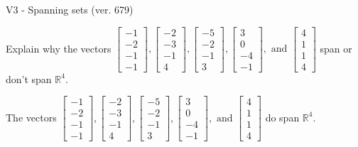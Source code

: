 \begin{exercise}
  \begin{exerciseTitle}V3 - Spanning sets (ver. 679)\end{exerciseTitle}
  \begin{exerciseStatement}
    Explain why the vectors \(\left[\begin{array}{r}
-1 \\
-2 \\
-1 \\
-1
\end{array}\right] , \left[\begin{array}{r}
-2 \\
-3 \\
-1 \\
4
\end{array}\right] , \left[\begin{array}{r}
-5 \\
-2 \\
-1 \\
3
\end{array}\right] , \left[\begin{array}{r}
3 \\
0 \\
-4 \\
-1
\end{array}\right] , \text{ and } \left[\begin{array}{r}
4 \\
1 \\
1 \\
4
\end{array}\right]\) span or don't span \(\mathbb{R}^4\). 
	


  \end{exerciseStatement}
  \begin{exerciseAnswer}
   The vectors \(\left[\begin{array}{r}
-1 \\
-2 \\
-1 \\
-1
\end{array}\right] , \left[\begin{array}{r}
-2 \\
-3 \\
-1 \\
4
\end{array}\right] , \left[\begin{array}{r}
-5 \\
-2 \\
-1 \\
3
\end{array}\right] , \left[\begin{array}{r}
3 \\
0 \\
-4 \\
-1
\end{array}\right] , \text{ and } \left[\begin{array}{r}
4 \\
1 \\
1 \\
4
\end{array}\right]\) 
  	 do  
	span \(\mathbb{R}^4\).
  



\end{exerciseAnswer}
\end{exercise}
